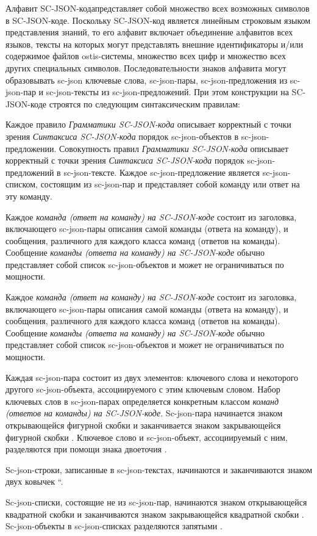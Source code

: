\begin{scnitemize}
Алфавит SC-JSON-кода\scnsupergroupsign представляет собой множество всех возможных символов в SC-JSON-коде. Поскольку
SC-JSON-код является линейным строковым языком представления знаний, то его алфавит включает объединение алфавитов
всех языков, тексты на которых могут представлять внешние идентификаторы и/или содержимое файлов ostis-системы,
множество всех цифр и множество всех других специальных символов. Последовательности знаков алфавита могут образовывать
sc-json ключевые слова, sc-json-пары, sc-json-предложения из sc-json-пар и sc-json-тексты из sc-json-предложений. При
этом конструкции на SC-JSON-коде строятся по следующим синтаксическим правилам:
\begin{scnitemize}
    \item Каждое правило \textit{Грамматики SC-JSON-кода} описывает корректный с точки зрения \textit{Синтаксиса
    SC-JSON-кода} порядок sc-json-объектов в sc-json-предложении. Совокупность правил \textit{Грамматики SC-JSON-кода}
    описывает корректный с точки зрения \textit{Синтаксиса SC-JSON-кода} порядок sc-json-предложений в sc-json-тексте.
    Каждое sc-json-предложение является sc-json-списком, состоящим из sc-json-пар и представляет собой команду или ответ
    на эту команду.
    \item Каждое \textit{команда (ответ на команду) на SC-JSON-коде} состоит из заголовка, включающего sc-json-пары
    описания самой команды (ответа на команду), и сообщения, различного для каждого класса команд (ответов на команды).
    Сообщение \textit{команды (ответа на команду) на SC-JSON-коде} обычно представляет собой список sc-json-объектов и
    может не ограничиваться по мощности.
    \item Каждое \textit{команда (ответ на команду) на SC-JSON-коде} состоит из заголовка, включающего sc-json-пары
    описания самой команды (ответа на команду), и сообщения, различного для каждого класса команд (ответов на команды).
    Сообщение \textit{команды (ответа на команду) на SC-JSON-коде} обычно представляет собой список sc-json-объектов и
    может не ограничиваться по мощности.
    \item Каждая sc-json-пара состоит из двух элементов: ключевого слова и некоторого другого sc-json-объекта,
    ассоциируемого с этим ключевым словом. Набор ключевых слов в sc-json-парах определяется конкретным классом
    \textit{команд (ответов на команды) на SC-JSON-коде}. Sc-json-пара начинается знаком открывающейся фигурной скобки
    \scnqq{\{} и заканчивается знаком закрывающейся фигурной скобки \scnqq{\}}. Ключевое слово и sc-json-объект,
    ассоциируемый с ним, разделяются при помощи знака двоеточия \scnqq{:}.
    \item Sc-json-строки, записанные в sc-json-текстах, начинаются и заканчиваются знаком двух ковычек \textquotedblleft.
    \item Sc-json-списки, состоящие не из sc-json-пар, начинаются знаком открывающейся квадратной скобки \scnqq{[} и
    заканчиваются знаком закрывающейся квадратной скобки \scnqq{]}. Sc-json-объекты в sc-json-списках разделяются
    запятыми \scnqq{,}.
\end{scnitemize}


\end{scnitemize}
